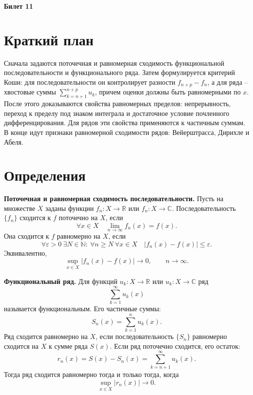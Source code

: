 \documentclass[12pt,a4paper]{article}
\newcommand{\R}{\mathbb{R}}
\newcommand{\eps}{\varepsilon}
\begin{document}
\begin{center}
{\Large\bfseries Билет 11}
\end{center}

\noindent{}

\section*{Краткий план}

Сначала задаются поточечная и равномерная сходимость функциональной
последовательности и функционального ряда. Затем формулируется критерий Коши:
для последовательности он контролирует разности \(f_{n+p}-f_n\), а для ряда --
хвостовые суммы \(\sum_{k=n+1}^{n+p}u_k\), причем оценки должны быть
равномерными по \(x\). После этого доказываются свойства равномерных пределов:
непрерывность, переход к пределу под знаком интеграла и достаточное условие
почленного дифференцирования. Для рядов эти свойства применяются к частичным
суммам. В конце идут признаки равномерной сходимости рядов: Вейерштрасса,
Дирихле и Абеля.

\section*{Определения}

\textbf{Поточечная и равномерная сходимость последовательности.}
Пусть на множестве \(X\) заданы функции \(f_n:X\to\R\) или
\(f_n:X\to\mathbb{C}\).
Последовательность \(\{f_n\}\) сходится к \(f\) поточечно на \(X\), если
\[
  \forall x\in X\quad \lim_{n\to\infty}f_n(x)=f(x).
\]
Она сходится к \(f\) равномерно на \(X\), если
\[
  \forall\eps>0\ \exists N\in\mathbb N:\ 
  \forall n\ge N\ \forall x\in X\quad |f_n(x)-f(x)|\le \eps.
\]
Эквивалентно,
\[
  \sup_{x\in X}|f_n(x)-f(x)|\to0,\qquad n\to\infty.
\]

\textbf{Функциональный ряд.}
Для функций \(u_k:X\to\R\) или \(u_k:X\to\mathbb{C}\) ряд
\[
  \sum_{k=1}^{\infty}u_k(x)
\]
называется функциональным. Его частичные суммы:
\[
  S_n(x)=\sum_{k=1}^n u_k(x).
\]
Ряд сходится равномерно на \(X\), если последовательность \(\{S_n\}\)
равномерно сходится на \(X\) к сумме ряда \(S(x)\). Если ряд поточечно
сходится, его остаток:
\[
  r_n(x)=S(x)-S_n(x)=\sum_{k=n+1}^{\infty}u_k(x).
\]
Тогда ряд сходится равномерно тогда и только тогда, когда
\[
  \sup_{x\in X}|r_n(x)|\to0.
\]
\end{document}
